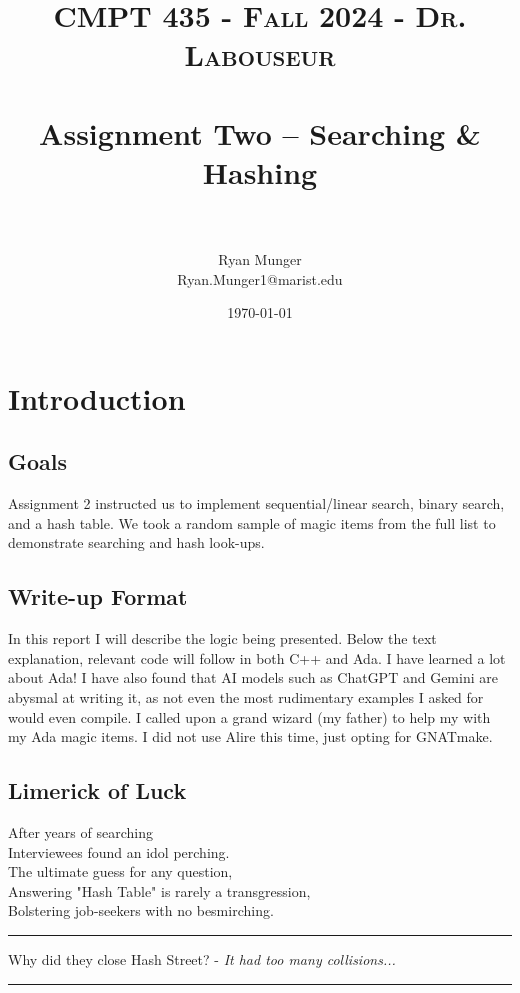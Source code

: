 \documentclass[letterpaper, 10pt]{article}
\title{	
   \normalfont \normalsize 
   \textsc{CMPT 435 - Fall 2024 - Dr. Labouseur} \\[10pt] %
   \horrule{0.5pt} \\[0.25cm] 	%
   \huge Assignment Two -- Searching \& Hashing\\     	    %
   \horrule{0.5pt} \\[0.25cm] 	%
}
\author{Ryan Munger \\ \normalsize Ryan.Munger1@marist.edu}
\date{\normalsize\today} 	%
\begin{document}
\maketitle %


\section{Introduction}
\subsection{Goals}
Assignment 2 instructed us to implement sequential/linear search, binary search, and a hash table. We took a random sample of magic items from the full list to demonstrate searching and hash look-ups.
\subsection{Write-up Format}
    In this report I will describe the logic being presented. Below the text explanation, relevant code will follow in both C++ and Ada. I have learned a lot about Ada! I have also found that AI models such as ChatGPT and Gemini are abysmal at writing it, as not even the most rudimentary examples I asked for would even compile. I called upon a grand wizard (my father) to help my with my Ada magic items. I did not use Alire this time, just opting for GNATmake.
\subsection{Limerick of Luck}
\noindent
After years of searching \\
Interviewees found an idol perching. \\
    \hspace*{1.5em}The ultimate guess for any question, \\
    \hspace*{1.5em}Answering "Hash Table" is rarely a transgression, \\
Bolstering job-seekers with no besmirching. \\

\hrule
\vspace{.25cm}
Why did they close Hash Street? - \textit{It had too many collisions...}\\
\hrule
\vspace{.25cm}
\end{document}
